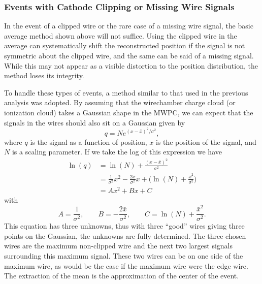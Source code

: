 \subsubsection{Events with Cathode Clipping or Missing Wire Signals}

In the event of a clipped wire or the rare case of a missing wire signal, the basic average method
shown above will not suffice. Using the clipped wire in the average can systematically shift the
reconstructed position if the signal is not symmetric about the clipped wire, and the same can
be said of a missing signal. While this may not appear as a visible distortion to the
position distribution, the method
loses its integrity.

To handle these types of events, a method similar to that used in the previous analysis
\cite{mpmThesis} was adopted. By assuming that the wirechamber charge cloud (or
ionization cloud) takes a Gaussian shape in the MWPC, we can expect that the signals
in the wires should also sit on a Gaussian given by
%
\begin{equation}
  q = Ne^{(x-\bar{x})^2/\sigma^2},
\end{equation}
%
where $q$ is the signal as a function of position, $x$ is the position of the signal, and $N$ is
a scaling parameter. If we take the log of this
expression we have
%
\begin{align} 
   \ln(q) &= \ln(N) + \frac{(x-\bar{x})^2}{\sigma^2} \\
   &= \frac{1}{\sigma^2}x^2 - \frac{2\bar{x}}{\sigma^2}x + \Big(\ln(N)+\frac{\bar{x}^2}{\sigma^2}\Big) \\
   &= Ax^2 + Bx + C \label{eq:gaussPos}
\end{align}
%
with
\begin{equation}
  A = \frac{1}{\sigma^2}, \qquad B = - \frac{2\bar{x}}{\sigma^2}, \qquad C = \ln(N)+\frac{\bar{x}^2}{\sigma^2}.
\end{equation}
This equation has three unknowns, thus with three ``good'' wires giving three points on the Gaussian, the unknowns
are fully determined. The three chosen wires are the maximum non-clipped wire and the next two largest signals
surrounding this maximum signal. These two wires can be on one side of the maximum wire, as would be the case if the
maximum wire were the edge wire. The extraction of the mean is the approximation of the center of the event.

